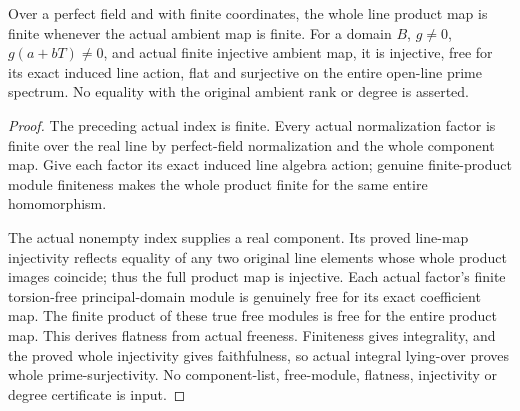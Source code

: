 \begin{theorem}
\label{algebra:finite-free-normalized-line-product}
\leanok
{}
Over a perfect field and with finite coordinates, the whole line
product map is finite whenever the actual ambient map is finite.
For a domain $B$, $g\ne0$, $g(a+bT)\ne0$, and actual finite injective
ambient map, it is injective, free for its exact induced line action,
flat and surjective on the entire open-line prime spectrum. No
equality with the original ambient rank or degree is asserted.
\end{theorem}
\begin{proof}
The preceding actual index is finite. Every actual normalization factor
is finite over the real line by perfect-field normalization and the
whole component map. Give each factor its exact induced line algebra
action; genuine finite-product module finiteness makes the whole product
finite for the same entire homomorphism.

The actual nonempty index supplies a real component. Its proved
line-map injectivity reflects equality of any two original line elements
whose whole product images coincide; thus the full product map is
injective. Each actual factor's finite torsion-free principal-domain
module is genuinely free for its exact coefficient map. The finite
product of these true free modules is free for the entire product map.
This derives flatness from actual freeness. Finiteness gives integrality,
and the proved whole injectivity gives faithfulness, so actual integral
lying-over proves whole prime-surjectivity. No component-list, free-module,
flatness, injectivity or degree certificate is input.
\end{proof}

